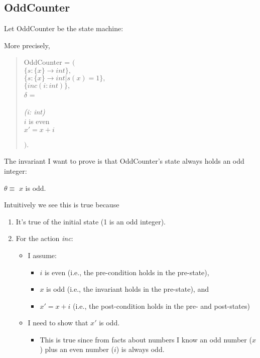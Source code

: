\subsection{OddCounter}

Let OddCounter be the state machine:

\centerline{}

\noindent More precisely,
\begin{verse}
OddCounter = $($ \\
$\{ s: \{x\} \rightarrow int \},$ \\
$\{ s: \{x\} \rightarrow int | s(x) = 1 \},$ \\
$\{inc(i: int)\},$ \\
$\delta$ = \\

\begin{spec}
\begin{tabbing}
\={\em(i: int)}\\
              $i$ is even\\
              $x' = x + i$
\end{tabbing}
\end{spec}

$)$.
\end{verse}

The invariant I want to prove is that OddCounter's
state always holds an odd integer:
\begin{center}
$\theta \equiv$ $x$ is odd.
\end{center}

Intuitively we see this
is true because
\begin{enumerate}
\item It's true of the initial state (1 is an odd integer).
\item  For the action {\em inc}:
\begin{itemize}
\item I assume:
\begin{itemize}
\item $i$ is even (i.e., the pre-condition holds in the pre-state),
\item $x$ is odd (i.e., the invariant holds in the pre-state), and
\item $x' = x + i$ (i.e., the post-condition holds in the pre- and post-states)
\end{itemize}
\item I need to show that $x'$ is odd.
\begin{itemize}
\item This is true since
from facts about numbers I know an odd number ($x$) plus an even number ($i$) is always odd.
\end{itemize}
\end{itemize}
\end{enumerate}


